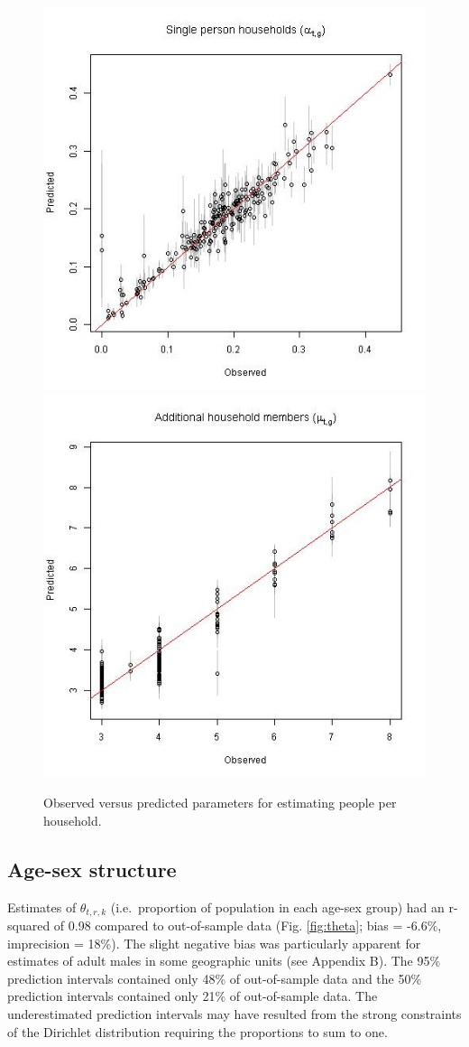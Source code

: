 \documentclass[]{book}
\begin{document}
\begin{figure}
\includegraphics[width=0.5\linewidth]{dat/GHAv1/fit_alpha} \includegraphics[width=0.5\linewidth]{dat/GHAv1/fit_lambda} \caption{Observed versus predicted parameters for estimating people per household.}\label{fig:alphalambda}
\end{figure}

\subsection{Age-sex structure}\label{age-sex-structure-1}

Estimates of \(\theta_{t,r,k}\) (i.e.~proportion of population in each
age-sex group) had an r-squared of 0.98 compared to out-of-sample data
(Fig. \ref{fig:theta}; bias = -6.6\%, imprecision = 18\%). The slight
negative bias was particularly apparent for estimates of adult males in
some geographic units (see Appendix B). The 95\% prediction intervals
contained only 48\% of out-of-sample data and the 50\% prediction
intervals contained only 21\% of out-of-sample data. The underestimated
prediction intervals may have resulted from the strong constraints of
the Dirichlet distribution requiring the proportions to sum to one.
\end{document}
